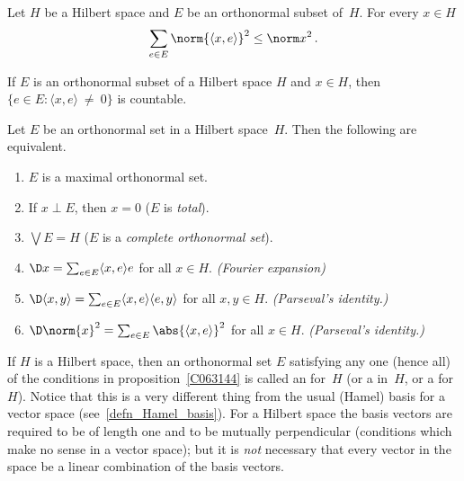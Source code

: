 \begin{prop}\label{C063141} Let $H$ be a Hilbert space and $E$ be an
orthonormal subset of~$H$.  For every $x \in H$
  \[ \sum_{e \in E} \norm{\langle x,e \rangle}^2 \le \norm x^2\,. \]
\end{prop}

\begin{cor} If $E$ is an orthonormal subset of a Hilbert space $H$ and $x \in H$, then
$\{e \in E\colon \langle x,e \rangle~\ne~0\}$ is countable.
\end{cor}

\begin{prop}\label{C063144} Let $E$ be an orthonormal set in a Hilbert space~$H$. Then the
following are equivalent.
 \begin{enumerate}
  \item $E$ is a maximal orthonormal set.
  \item If $x \perp E$, then $x = 0$ ($E$ is \emph{total}).
  \item $\bigvee E = H$ ($E$ is a \emph{complete orthonormal set}).
  \item $\D x = \sum_{e \in E} \langle x,e \rangle e$ for all $x \in H$. \emph{(Fourier
expansion)}
  \item $\D \langle x,y \rangle = \sum_{e \in E} \langle x,e \rangle \langle e,y \rangle$
for all $x,y \in H$. \emph{(Parseval's identity.)}
  \item $\D \norm{x}^2 = \sum_{e \in E} \abs{\langle x,e \rangle}^2$ for all $x \in H$.
\emph{(Parseval's identity.)}
 \end{enumerate}
\end{prop}

\begin{defn}\label{C063147} If $H$ is a Hilbert space, then an orthonormal set $E$ satisfying
any one (hence all) of the conditions in proposition~\ref{C063144} is called an
 for~$H$ (or a
 in~$H$, or a
 for~$H$).  Notice that this is a very different thing from the
usual (Hamel) basis for a vector space (see~\ref{defn_Hamel_basis}).  For a Hilbert space
the basis vectors are required to be of length one and to be mutually perpendicular
(conditions which make no sense in a vector space); but it is \emph{not} necessary that
every vector in the space be a linear combination of the basis vectors.
\end{defn}

